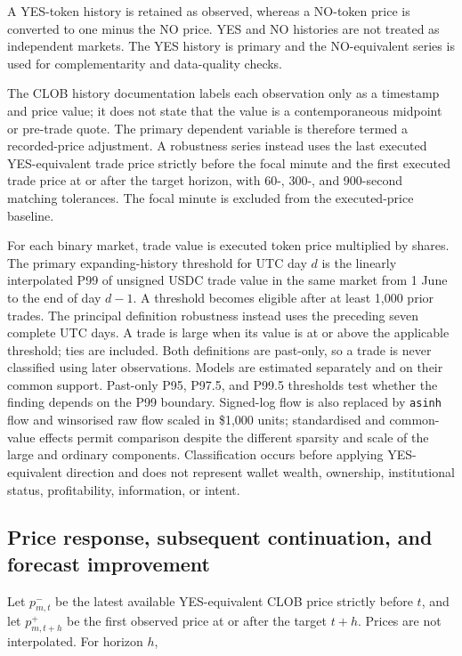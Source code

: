 A YES-token history is retained as observed, whereas a NO-token price is converted to one minus the NO price. YES and NO histories are not treated as independent markets. The YES history is primary and the NO-equivalent series is used for complementarity and data-quality checks.

The CLOB history documentation labels each observation only as a timestamp and
price value; it does not state that the value is a contemporaneous midpoint or
pre-trade quote. The primary dependent variable is therefore termed a
recorded-price adjustment. A robustness series instead uses the last executed
YES-equivalent trade price strictly before the focal minute and the first
executed trade price at or after the target horizon, with 60-, 300-, and
900-second matching tolerances. The focal minute is excluded from the
executed-price baseline.

For each binary market, trade value is executed token price multiplied by
shares. The primary expanding-history threshold for UTC day $d$ is the linearly
interpolated P99 of unsigned USDC trade value in the same market from 1 June to
the end of day $d-1$. A threshold becomes eligible after at least 1,000 prior
trades. The principal definition robustness instead uses the preceding seven
complete UTC days. A trade is large when its value is at or above the applicable
threshold; ties are included. Both definitions are past-only, so a trade is
never classified using later observations. Models are estimated separately and
on their common support. Past-only P95, P97.5, and P99.5 thresholds test whether
the finding depends on the P99 boundary. Signed-log flow is also replaced by
\texttt{asinh} flow and winsorised raw flow scaled in \$1,000 units;
standardised and common-value effects permit comparison despite the different
sparsity and scale of the large and ordinary components. Classification occurs before applying YES-equivalent
direction and does not represent wallet wealth, ownership, institutional status,
profitability, information, or intent.

\subsection{Price response, subsequent continuation, and forecast improvement}

Let $p^-_{m,t}$ be the latest available YES-equivalent CLOB price strictly
before $t$, and let $p^+_{m,t+h}$ be the first observed price at or after the
target $t+h$. Prices are not interpolated. For horizon $h$,

